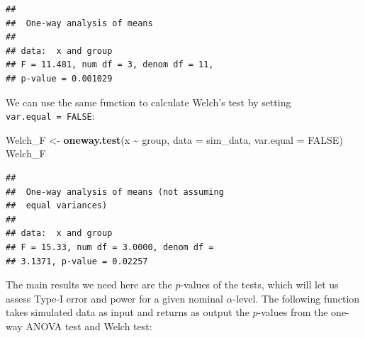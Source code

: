 \documentclass[
]{book}
\newenvironment{Shaded}{\begin{snugshade}}{\end{snugshade}}
\newcommand{\AttributeTok}[1]{\textcolor[rgb]{0.13,0.29,0.53}{#1}}
\newcommand{\ConstantTok}[1]{\textcolor[rgb]{0.56,0.35,0.01}{#1}}
\newcommand{\ControlFlowTok}[1]{\textcolor[rgb]{0.13,0.29,0.53}{\textbf{#1}}}
\newcommand{\FunctionTok}[1]{\textcolor[rgb]{0.13,0.29,0.53}{\textbf{#1}}}
\newcommand{\NormalTok}[1]{#1}
\newcommand{\OtherTok}[1]{\textcolor[rgb]{0.56,0.35,0.01}{#1}}
\newcommand{\SpecialCharTok}[1]{\textcolor[rgb]{0.81,0.36,0.00}{\textbf{#1}}}
\begin{document}
\begin{verbatim}
## 
##  One-way analysis of means
## 
## data:  x and group
## F = 11.481, num df = 3, denom df = 11,
## p-value = 0.001029
\end{verbatim}

We can use the same function to calculate Welch's test by setting \texttt{var.equal\ =\ FALSE}:

\begin{Shaded}
\begin{Highlighting}[]
\NormalTok{Welch\_F }\OtherTok{\textless{}{-}} \FunctionTok{oneway.test}\NormalTok{(x }\SpecialCharTok{\textasciitilde{}}\NormalTok{ group, }\AttributeTok{data =}\NormalTok{ sim\_data, }\AttributeTok{var.equal =} \ConstantTok{FALSE}\NormalTok{)}
\NormalTok{Welch\_F}
\end{Highlighting}
\end{Shaded}

\begin{verbatim}
## 
##  One-way analysis of means (not assuming
##  equal variances)
## 
## data:  x and group
## F = 15.33, num df = 3.0000, denom df =
## 3.1371, p-value = 0.02257
\end{verbatim}

The main results we need here are the \(p\)-values of the tests, which will let us assess Type-I error and power for a given nominal \(\alpha\)-level. The following function takes simulated data as input and returns as output the \(p\)-values from the one-way ANOVA test and Welch test:

\begin{Shaded}
\end{Shaded}
\end{document}
